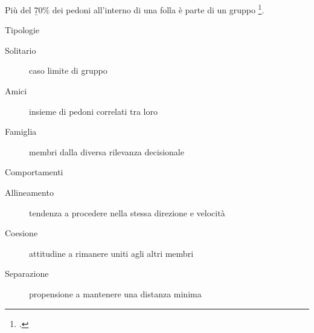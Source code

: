 Più del \b{70\%} dei pedoni all'interno di una folla è parte di un gruppo \footcite{Moussad2010}.

\begin{block}{Tipologie}
    \begin{description}
        \item[Solitario] caso limite di gruppo
        \item[Amici] insieme di pedoni correlati tra loro
        \item[Famiglia] membri dalla diversa rilevanza decisionale
    \end{description}
\end{block}

\begin{block}{Comportamenti}
    \begin{description}
        \item[Allineamento] tendenza a procedere nella stessa direzione e velocità
        \item[Coesione] attitudine a rimanere uniti agli altri membri
        \item[Separazione] propensione a mantenere una distanza minima
    \end{description}
\end{block}